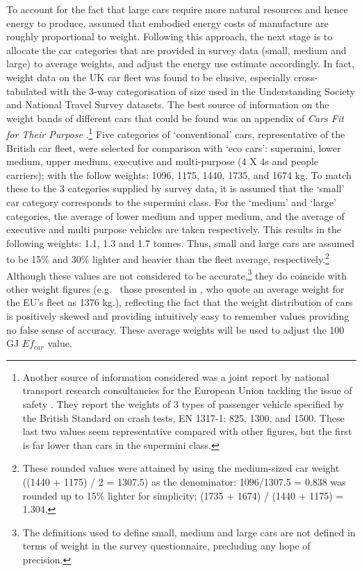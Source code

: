 To account for the fact that large cars require
more natural resources and hence energy to produce, 
\citet{Mikkola201023} assumed that embodied energy costs of manufacture
are roughly proportional to weight. Following this approach, the next stage is
to allocate the car categories that are provided in survey data (small, medium
and large) to average weights, and adjust the energy use estimate accordingly.
In fact, weight data on the UK car fleet was found to be elusive, especially
cross-tabulated with the 3-way categorisation of size used in the Understanding
Society and National Travel Survey datasets. The best source of information
on the weight bands of different cars that could be found was an appendix
of \emph{Cars Fit for Their Purpose}
\citep{plowden2008cars}.\footnote{Another
source of information considered was a joint
report by national transport research consultancies for the European Union
tackling the issue of safety \citep[appendix 2]{gail2006improver}.
They report the weights of 3 types of passenger vehicle specified by
the British Standard on crash tests, EN 1317-1:
825, 1300, and 1500. These last two values seem
representative compared with other figures,
but the first is far lower than cars in the supermini class.
}
Five categories of `conventional' cars, representative of the British car fleet,
were selected for comparison with
`eco cars': supermini, lower medium, upper medium, executive and multi-purpose
(4 X 4s and people carriers); with the follow weights: 1096,
1175, 1440, 1735, and 1674 kg. To match these to the
3 categories supplied by survey data, it is assumed that the `small' car
category corresponds to the supermini class. For the `medium' and `large'
categories, the average of lower medium and upper medium,
and the average of executive and multi purpose vehicles are taken respectively.
This results in the following weights: 1.1, 1.3 and 1.7 tonnes.
Thus, small and large cars are assumed
to be 15\% and 30\% lighter and heavier than the fleet average,
respectively.\footnote{These rounded values
were attained by using the medium-sized car weight
((1440 + 1175) / 2 = 1307.5)
as the denominator: 1096/1307.5 = 0.838 was rounded up
to 15\% lighter for simplicity; (1735 + 1674) / (1440 + 1175)
= 1.304.
}
Although these values are not considered to be
accurate,\footnote{The
definitions used to define small, medium and large cars
are not defined in terms of weight in the survey questionnaire,
precluding any hope of precision.
}
they do coincide with other weight figures
(e.g.~ those presented in \citep[appendix 2]{gail2006improver}, who quote an
average weight for the EU's fleet as 1376 kg.), reflecting the fact that
the weight distribution of cars is positively skewed and providing
intuitively easy to remember values providing no false sense of accuracy.
These average weights will be used to
adjust the 100 GJ $Ef_{car}$ value.

